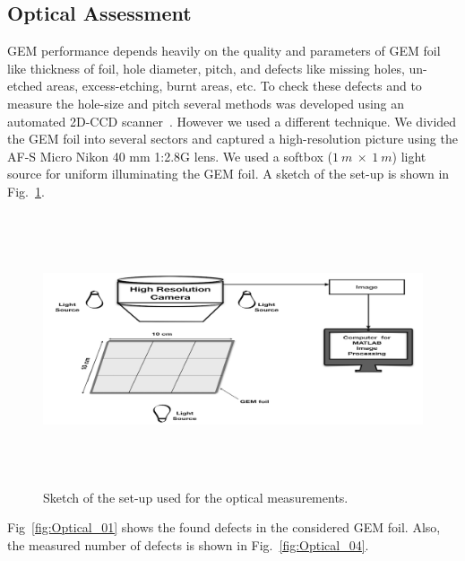 \subsection{Optical Assessment}
GEM performance depends heavily on the quality and parameters of GEM foil like thickness of foil, hole diameter, pitch, and defects like missing holes, un-etched areas, excess-etching, burnt areas, etc. 
To check these defects and to measure the hole-size and pitch several methods was developed using an automated 2D-CCD scanner~\cite{Posik2015, Becker2006}. 
However we used a different technique. We divided the GEM foil into several sectors and captured a high-resolution picture using the AF-S Micro Nikon 40 mm 1:2.8G lens. We used a softbox ($1~m~\times~1~m$) light source for uniform illuminating the GEM foil.
A sketch of the set-up is shown in Fig.~\ref{fig:Optical_Sketch}.
\begin{figure}[!htbp]
    \centering
        \includegraphics[width=12cm, height=8cm]{figures/GEM/figures/2.jpeg}
   \caption{Sketch of the set-up used for the optical measurements.}   \label{fig:Optical_Sketch}
\end{figure}
Fig~\ref{fig:Optical_01} shows the found defects in the considered GEM foil. Also, the measured number of defects is shown in Fig.~\ref{fig:Optical_04}.
